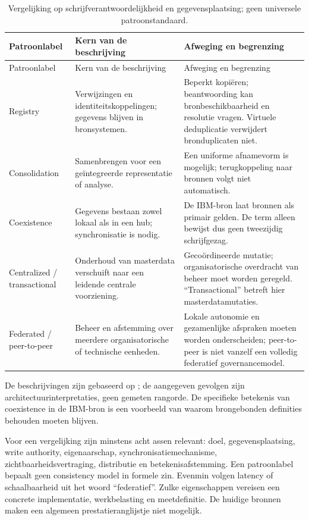 \begin{longtable}{@{}P{.17\linewidth}P{.33\linewidth}P{.42\linewidth}@{}}
\caption{Vergelijking op schrijfverantwoordelijkheid en gegevensplaatsing; geen universele patroonstandaard.}\\
\toprule Patroonlabel & Kern van de beschrijving & Afweging en begrenzing \\\midrule\endfirsthead
\toprule Patroonlabel & Kern van de beschrijving & Afweging en begrenzing \\\midrule\endhead
Registry & Verwijzingen en identiteitskoppelingen; gegevens blijven in bronsystemen. & Beperkt kopiëren; beantwoording kan bronbeschikbaarheid en resolutie vragen. Virtuele deduplicatie verwijdert bronduplicaten niet. \\
Consolidation & Samenbrengen voor een geïntegreerde representatie of analyse. & Een uniforme afnamevorm is mogelijk; terugkoppeling naar bronnen volgt niet automatisch. \\
Coexistence & Gegevens bestaan zowel lokaal als in een hub; synchronisatie is nodig. & De IBM-bron laat bronnen als primair gelden. De term alleen bewijst dus geen tweezijdig schrijfgezag. \\
Centralized / transactional & Onderhoud van masterdata verschuift naar een leidende centrale voorziening. & Gecoördineerde mutatie; organisatorische overdracht van beheer moet worden geregeld. ``Transactional'' betreft hier masterdatamutaties. \\
Federated / peer-to-peer & Beheer en afstemming over meerdere organisatorische of technische eenheden. & Lokale autonomie en gezamenlijke afspraken moeten worden onderscheiden; peer-to-peer is niet vanzelf een volledig federatief governancemodel. \\
\bottomrule
\end{longtable}
De beschrijvingen zijn gebaseerd op \textcite{P01,L20,L23}; de aangegeven gevolgen zijn architectuurinterpretaties, geen gemeten rangorde. De specifieke betekenis van coexistence in de IBM-bron is een voorbeeld van waarom brongebonden definities behouden moeten blijven.

Voor een vergelijking zijn minstens acht assen relevant: doel, gegevensplaatsing, write authority, eigenaarschap, synchronisatiemechanisme, zichtbaarheidsvertraging, distributie en betekenisafstemming. Een patroonlabel bepaalt geen consistency model in formele zin. Evenmin volgen latency of schaalbaarheid uit het woord ``federatief''. Zulke eigenschappen vereisen een concrete implementatie, werkbelasting en meetdefinitie. De huidige bronnen maken een algemeen prestatieranglijstje niet mogelijk. \parencite{P01,P02,L24}

